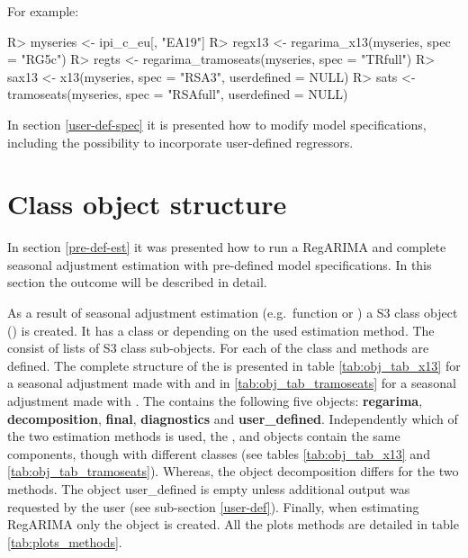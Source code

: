 \documentclass[article]{jss}
\begin{document}
For example:

\begin{CodeChunk}

\begin{CodeInput}
R> myseries <- ipi_c_eu[, "EA19"]
R> regx13 <- regarima_x13(myseries, spec = "RG5c")
R> regts <- regarima_tramoseats(myseries, spec = "TRfull")
R> sax13 <- x13(myseries, spec = "RSA3", userdefined = NULL)
R> sats <- tramoseats(myseries, spec = "RSAfull", userdefined = NULL)
\end{CodeInput}
\end{CodeChunk}

In section \ref{user-def-spec} it is presented how to modify model
specifications, including the possibility to incorporate user-defined
regressors.

\hypertarget{sa-obj-struc}{%
\section{Class object structure}\label{sa-obj-struc}}

In section \ref{pre-def-est} it was presented how to run a RegARIMA and
complete seasonal adjustment estimation with pre-defined model
specifications. In this section the outcome will be described in detail.

As a result of seasonal adjustment estimation (e.g.~function 
or ) a S3 class object () is created.
It has a class  or 
depending on the used estimation method. The  consist of
lists of S3 class sub-objects. For each of the class  and
 methods are defined. The complete structure of the
 is presented in table \ref{tab:obj_tab_x13} for a
seasonal adjustment made with  and in
\ref{tab:obj_tab_tramoseats} for a seasonal adjustment made with
. The  contains the following five
objects: \textbf{regarima}, \textbf{decomposition}, \textbf{final},
\textbf{diagnostics} and \textbf{user\_defined}. Independently which of
the two estimation methods is used, the , 
and  objects contain the same components, though with
different classes (see tables \ref{tab:obj_tab_x13} and
\ref{tab:obj_tab_tramoseats}). Whereas, the object decomposition differs
for the two methods. The object user\_defined is empty unless additional
output was requested by the user (see sub-section \ref{user-def}).
Finally, when estimating RegARIMA only the  object is
created. All the plots methods are detailed in table
\ref{tab:plots_methods}.
\end{document}
